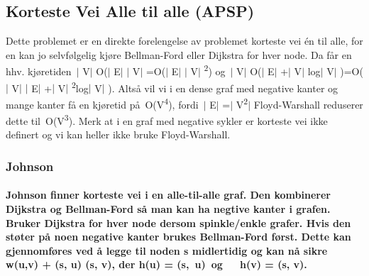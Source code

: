 \documentclass[12pt]{report}
\begin{document}
\vspace{\baselineskip}

\vspace{\baselineskip}
\setlength{\parskip}{6.0pt}

\vspace{\baselineskip}\subsection*{Korteste Vei Alle til alle (APSP)}
\setlength{\parskip}{0.0pt}
Dette problemet er en direkte forelengelse av problemet korteste vei én til alle, for en kan jo selvfølgelig kjøre Bellman-Ford eller Dijkstra for hver node. Da får en hhv. kjøretiden $ \vert $ V$ \vert $ O($ \vert $ E$ \vert $ $ \vert $ V$ \vert $ =O($ \vert $ E$ \vert $ $ \vert $ V$ \vert $ \textsuperscript{2}) og $ \vert $ V$ \vert $ O($ \vert $ E$ \vert $ +$ \vert $ V$ \vert $ log$ \vert $ V$ \vert $ )=O($ \vert $ V$ \vert $ $ \vert $ E$ \vert $ +$ \vert $ V$ \vert $ \textsuperscript{2}log$ \vert $ V$ \vert $ ). Altså vil vi i en dense graf med negative kanter og mange kanter få en kjøretid på O(V\textsuperscript{4}), fordi $ \vert $ E$ \vert $ =$ \vert $ V\textsuperscript{2}$ \vert $  Floyd-Warshall reduserer dette til O(V\textsuperscript{3}). Merk at i en graf med negative sykler er korteste vei ikke definert og vi kan heller ikke bruke Floyd-Warshall.\par


\vspace{\baselineskip}
\subsubsection*{Johnson}
\setlength{\parskip}{6.0pt}
\paragraph*{Johnson finner korteste vei i en alle-til-alle graf. Den kombinerer Dijkstra og Bellman-Ford så man kan ha negtive kanter i grafen. Bruker Dijkstra for hver node dersom spinkle/enkle grafer. Hvis den støter på noen negative kanter brukes Bellman-Ford først. Dette kan gjennomføres ved å legge til noden s midlertidig og kan nå sikre w(u,v) + (s, u)  (s, v), der h(u) = (s,\ u)\ og\ \ \    h(v) = (s, v).}
\end{document}
